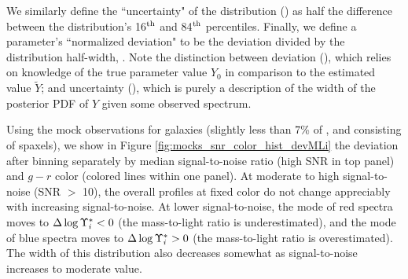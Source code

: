 We similarly define the ``uncertainty" of the distribution () as half the difference between the distribution's 16$^{\rm th}$ and 84$^{\rm th}$ percentiles. Finally, we define a parameter's ``normalized deviation" to be the deviation divided by the distribution half-width, . Note the distinction between deviation (), which relies on knowledge of the true parameter value $Y_0$ in comparison to the estimated value $\tilde{Y}$; and uncertainty (), which is purely a description of the width of the posterior PDF of $Y$ given some observed spectrum.

Using the mock observations for \ntestgalaxies galaxies (slightly less than 7\% of \mplv, and consisting of \ntestspaxels spaxels), we show in Figure \ref{fig:mocks_snr_color_hist_devMLi} the deviation  after binning separately by median signal-to-noise ratio (high SNR in top panel) and $g-r$ color (colored lines within one panel). At moderate to high signal-to-noise (SNR $>$ 10), the overall  profiles at fixed color do not change appreciably with increasing signal-to-noise. At lower signal-to-noise, the mode of red spectra moves to $\Delta \log \Upsilon^*_{i} < 0$ (the mass-to-light ratio is underestimated), and the mode of blue spectra moves to $\Delta \log \Upsilon^*_{i} > 0$ (the mass-to-light ratio is overestimated). The width of this distribution also decreases somewhat as signal-to-noise increases to moderate value.

